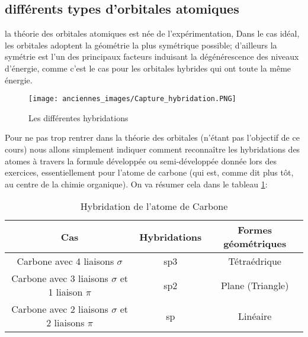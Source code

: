 \subsection{différents types d'orbitales atomiques}
la théorie des orbitales atomiques est née de l'expérimentation, Dans le cas idéal, les orbitales adoptent la géométrie la plus symétrique possible; d'ailleurs la symétrie est l'un des principaux facteurs induisant la dégénérescence des niveaux d'énergie, comme c'est le cas pour les orbitales hybrides qui ont toute la même énergie.
\begin{figure}[htbp]
    \begin{center}
        \texttt{[image: anciennes\_images/Capture\_hybridation.PNG]} 
    \end{center}
    \caption{Les différentes hybridations}
    \label{fig:hybridation}
\end{figure}
Pour ne pas trop rentrer dans la théorie des orbitales (n'étant pas l'objectif de ce cours) nous allons simplement indiquer comment reconnaître les hybridations des atomes à travers la formule développée ou semi-développée donnée lors des exercices, essentiellement pour l'atome de carbone (qui est, comme dit plus tôt, au centre de la chimie organique). On va résumer cela dans le tableau \ref{tab_hybridation}:
\begin{table}[!ht]
    \caption{Hybridation de l'atome de Carbone}
    \begin{center}
        \begin{tabular}{|c|c|c|}
            \hline
            \textbf{Cas} & \textbf{Hybridations} & \textbf{Formes géométriques} \\
            \hline
            Carbone avec 4 liaisons $\sigma$ & sp3 & Tétraédrique \\
            \hline
            Carbone avec 3 liaisons $\sigma$ et 1 liaison $\pi$ & sp2 & Plane (Triangle)\\
            \hline
            Carbone avec 2 liaisons $\sigma$  et 2 liaisons $\pi$ & sp & Linéaire\\
            \hline
        \end{tabular} 
    \end{center}
    \label{tab_hybridation}
\end{table}

